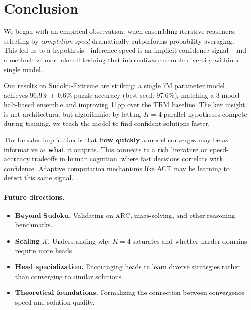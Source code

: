 \section{Conclusion}

We began with an empirical observation: when ensembling iterative reasoners,
selecting by \emph{completion speed} dramatically outperforms probability
averaging. This led us to a hypothesis---inference speed is an implicit
confidence signal---and a method: winner-take-all training that internalizes
ensemble diversity within a single model.

Our results on Sudoku-Extreme are striking: a single 7M parameter model achieves
96.9\% $\pm$ 0.6\% puzzle accuracy (best seed: 97.6\%), matching a 3-model
halt-based ensemble and improving 11pp over the TRM baseline. The key insight is
not architectural but algorithmic: by letting $K{=}4$ parallel hypotheses
compete during training, we teach the model to find confident solutions faster.

The broader implication is that \textbf{how quickly} a model converges may be
as informative as \textbf{what} it outputs. This connects to a rich literature
on speed-accuracy tradeoffs in human cognition, where fast decisions correlate
with confidence. Adaptive computation mechanisms like ACT may be learning to
detect this same signal.

\ifdefined\isicml\vspace{-1em}\fi
\paragraph{Future directions.}
\begin{itemize}
  \item \textbf{Beyond Sudoku.} Validating on ARC, maze-solving, and other
    reasoning benchmarks.
  \item \textbf{Scaling $K$.} Understanding why $K{=}4$ saturates and whether
    harder domains require more heads.
  \item \textbf{Head specialization.} Encouraging heads to learn diverse
    strategies rather than converging to similar solutions.
  \item \textbf{Theoretical foundations.} Formalizing the connection between
    convergence speed and solution quality.
\end{itemize}

